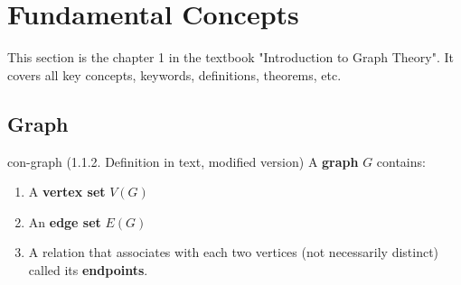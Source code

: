 \documentclass[../src/handouts/main.tex]{subfiles}
\begin{document}

\section{Fundamental Concepts}

\newcommand\bipartitegraphhelper[1]{
  \begin{tikzpicture}[
      point/.style = {circle, fill=black, inner sep=1mm}]
    \def \distance {1.5} %
    \foreach \x in {0,...,3} %
    \foreach \y in {0,...,1} %
    \node[point] (\y\x) at (\x * \distance, \y * - \distance) {};

    \draw (00) -- (10) -- (01) -- (11) -- (03) -- (10);
    \draw (12) -- (02) -- (13);

    \ifthenelse{\isempty{#1}}%
    {}%
    {
      \node at (4 * \distance, 0) {people}
      node at (4 * \distance, - \distance) {jobs};
    }%
  \end{tikzpicture}
}%

\def \bipartitegraph {\bipartitegraphhelper{}}%

\def \bipartitegraphwithlabels {\bipartitegraphhelper{with labels}}%

\def \tripartitegraph {%
  \begin{tikzpicture}[every node/.style = {circle, fill=black, inner sep=1mm}]
    \node (a1) at (-3, 1) {} %
    node (a2) at (-2, 0) {} %
    node (b1) at (-1, 3) {} %
    node (b2) at (0, 3) {} %
    node (b3) at (1, 3) {} %
    node (c1) at (2, 0) {} %
    node (c2) at (3, 1) {}; %
    \draw (b1) -- (a1) -- (b2) -- (a2) -- (c1) -- (b2) -- (c2) -- (b3) -- (c1);
  \end{tikzpicture}
}%

This section is the chapter 1 in the textbook "Introduction to Graph Theory". It covers all key concepts, keywords, definitions, theorems, etc.

\subsection{Graph}

\begin{definition}{}{con-graph}
  (1.1.2. Definition in text, modified version)
  A \textbf{graph} $G$ contains:
  \begin{enumerate}
    \item A \textbf{vertex set} $V(G)$
    \item An \textbf{edge set} $E(G)$
    \item A relation that associates with each two vertices (not necessarily distinct) called its \textbf{endpoints}.
  \end{enumerate}
\end{definition}
\end{document}
